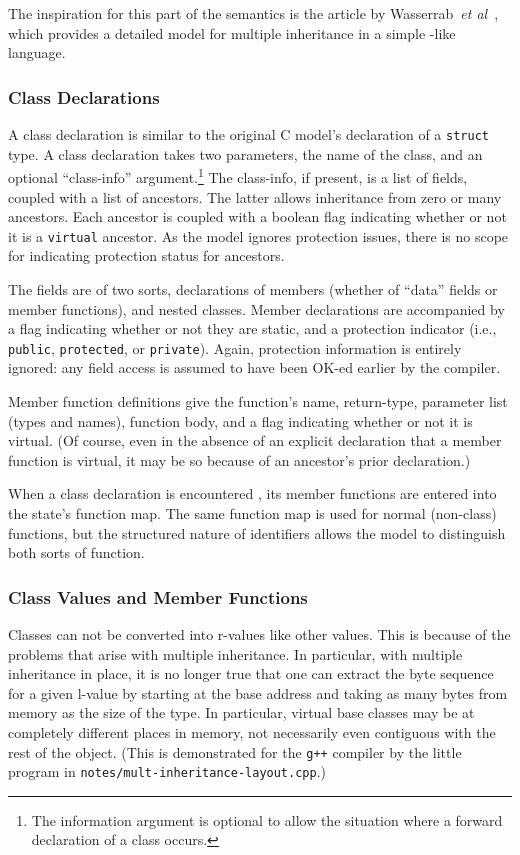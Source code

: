 \documentclass[11pt]{article}
\begin{document}
The inspiration for this part of the semantics is the article by
Wasserrab~\emph{et al}~\cite{wasserrab-nst-OOPSLA06}, which provides a
detailed model for multiple inheritance in a simple \cpp-like
language.

\subsubsection{Class Declarations}
\label{sec:class-declaration}
A class declaration is similar to the original C model's declaration
of a \texttt{struct} type.  A class declaration takes two parameters,
the name of the class, and an optional ``class-info''
argument.\footnote{The information argument is optional to allow the
  situation where a forward declaration of a class occurs.}  The
class-info, if present, is a list of fields, coupled with a list of
ancestors.  The latter allows inheritance from zero or many ancestors.
Each ancestor is coupled with a boolean flag indicating whether or not
it is a \texttt{virtual} ancestor.  As the model ignores protection
issues, there is no scope for indicating protection status for
ancestors.

The fields are of two sorts, declarations of members (whether of
``data'' fields or member functions), and nested classes.  Member
declarations are accompanied by a flag indicating whether or not they
are static, and a protection indicator (i.e., \texttt{public},
\texttt{protected}, or \texttt{private}).  Again, protection
information is entirely ignored: any field access is assumed to have
been OK-ed earlier by the compiler.

Member function definitions give the function's name, return-type,
parameter list (types and names), function body, and a flag indicating
whether or not it is virtual.  (Of course, even in the absence of an
explicit declaration that a member function is virtual, it may be so
because of an ancestor's prior declaration.)

When a class declaration is encountered , its member functions are
entered into the state's function map.  The same function map is used
for normal (non-class) functions, but the structured nature of \cpp{}
identifiers allows the model to distinguish both sorts of function.

\subsubsection{Class Values and Member Functions}
\label{sec:class-values}
Classes can not be converted into r-values like other values.  This is
because of the problems that arise with multiple inheritance.  In
particular, with multiple inheritance in place, it is no longer true
that one can extract the byte sequence for a given l-value by starting
at the base address and taking as many bytes from memory as the size
of the type.  In particular, virtual base classes may be at completely
different places in memory, not necessarily even contiguous with the
rest of the object.  (This is demonstrated for the \texttt{g++}
compiler by the little program in
\texttt{notes/mult-inheritance-layout.cpp}.)
\end{document}
